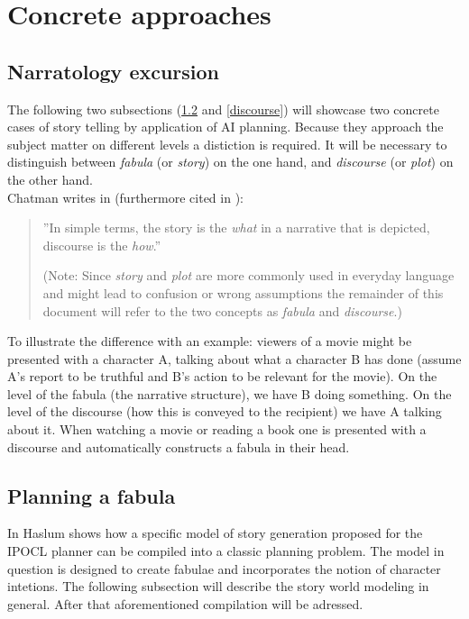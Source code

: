 \section{Concrete approaches}\label{approaches}
\subsection{Narratology excursion}
The following two subsections (\ref{fabula} and \ref{discourse}) will showcase two concrete cases of story telling by application of AI planning. Because they approach the subject matter on different levels a distiction is required. It will be necessary to distinguish between \emph{fabula} (or \emph{story}) on the one hand, and \emph{discourse} (or \emph{plot}) on the other hand.\\
Chatman writes in \cite{Chatman1980} (furthermore cited in \cite{Herman10}):
\begin{quote}
''In simple terms, the story is the \emph{what} in a narrative that is depicted, discourse is the \emph{how}.''

(Note: Since \emph{story} and \emph{plot} are more commonly used in everyday language and might lead to confusion or wrong assumptions the remainder of this document will refer to the two concepts as \emph{fabula} and \emph{discourse}.)
\end{quote}
To illustrate the difference with an example: viewers of a movie might be presented with a character A, talking about what a character B has done (assume A's report to be truthful and B's action to be relevant for the movie). On the level of the fabula (the narrative structure), we have B doing something. On the level of the discourse (how this is conveyed to the recipient) we have A talking about it. When watching a movie or reading a book one is presented with a discourse and automatically constructs a fabula in their head.
\subsection{Planning a fabula}\label{fabula}
In \cite{Haslum14} Haslum shows how a specific model of story generation proposed for the IPOCL planner\cite{Riedl10} can be compiled into a classic planning problem. The model in question is designed to create fabulae and incorporates the notion of character intetions. The following subsection will describe the story world modeling in general. After that aforementioned compilation will be adressed.

